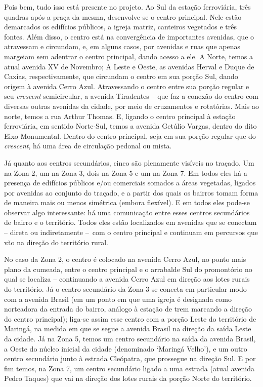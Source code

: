 \documentclass[12pt, a4paper]{book} %
\begin{document}
        Pois bem, tudo isso está presente no projeto. Ao Sul da estação ferroviária, três quadras após a praça da mesma, desenvolve-se o centro principal. Nele estão demarcados os edifícios públicos, a igreja matriz, canteiros vegetados e três fontes. Além disso, o centro está na convergência de importantes avenidas, que o atravessam e circundam, e, em alguns casos, por avenidas e ruas que apenas margeiam sem adentrar o centro principal, dando acesso a ele. A Norte, temos a atual avenida XV de Novembro; A Leste e Oeste, as avenidas Herval e Duque de Caxias, respectivamente, que circundam o centro em sua porção Sul, dando origem à avenida Cerro Azul. Atravessando o centro entre sua porção regular e seu \textit{crescent} semicircular, a avenida Tiradentes – que faz a conexão do centro com diversas outras avenidas da cidade, por meio de cruzamentos e rotatórias. Mais ao norte, temos a rua Arthur Thomas. E, ligando o centro principal à estação ferroviária, em sentido Norte-Sul, temos a avenida Getúlio Vargas, dentro do dito Eixo Monumental. Dentro do centro principal, seja em sua porção regular que do \textit{crescent}, há uma área de circulação pedonal ou mista. 

        Já quanto aos centros secundários, cinco são plenamente visíveis no traçado. Um na Zona 2, um na Zona 3, dois na Zona 5 e um na Zona 7. Em todos eles há a presença de edifícios públicos e/ou comerciais somados a áreas vegetadas, ligados por avenidas ao conjunto do traçado, e a partir dos quais os bairros tomam forma de maneira mais ou menos simétrica (embora flexível). E em todos eles pode-se observar algo interessante: há uma comunicação entre esses centros secundários de bairro e o território. Todos eles estão localizados em avenidas que se conectam – direta ou indiretamente – com o centro principal e continuam em percursos que vão na direção do território rural. 
        
        No caso da Zona 2, o centro é colocado na avenida Cerro Azul, no ponto mais plano da cumeada, entre o centro principal e o arrabalde Sul do promontório no qual se localiza – continuando a avenida Cerro Azul em direção aos lotes rurais do território. Já o centro secundário da Zona 3 se conecta em particular modo com a avenida Brasil (em um ponto em que uma igreja é designada como norteadora da entrada do bairro, análogo à estação de trem marcando a direção do centro principal); liga-se assim esse centro com a porção Leste do território de Maringá, na medida em que se segue a avenida Brasil na direção da saída Leste da cidade. Já na Zona 5, temos um centro secundário na saída da avenida Brasil, a Oeste do núcleo inicial da cidade (denominado `Maringá Velho'), e um outro centro secundário junto à estrada Cleópatra, que prossegue na direção Sul. E por fim temos, na Zona 7, um centro secundário ligado a uma estrada (atual avenida Pedro Taques) que vai na direção dos lotes rurais da porção Norte do território. 
\end{document}
